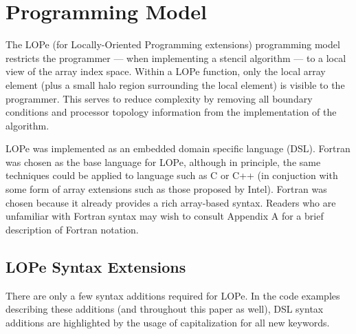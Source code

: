 \section{Programming Model}

The LOPe (for Locally-Oriented Programming extensions) programming model restricts the programmer ---
when implementing a stencil algorithm --- to a local view of the array index space.  Within a LOPe
function, only the local array element (plus a small halo region surrounding the local element) is
visible to the programmer.  This serves to reduce complexity by removing all boundary conditions and
processor topology information from the implementation of the algorithm.


LOPe was implemented as an embedded domain specific language (DSL).  Fortran was chosen as the base
language for LOPe, although in principle, the same techniques could be applied to language such as C
or C++ (in conjuction with some form of array extensions such as those proposed by Intel).  Fortran
was chosen because it already provides a rich array-based syntax.  Readers who are unfamiliar with
Fortran syntax may wish to consult Appendix A for a brief description of Fortran notation.

\subsection{LOPe Syntax Extensions}

There are only a few syntax additions required for LOPe.  In the code examples describing these
additions (and throughout this paper as well), DSL syntax additions are highlighted by the usage of
capitalization for all new keywords.

